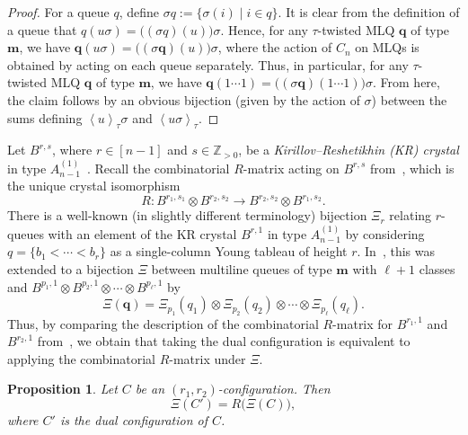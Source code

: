 \documentclass[reqno]{amsart}
\newcommand{\0}{\phantom{c}}
\newcommand{\swt}[1]{\left\langle #1 \right\rangle} %
\newcommand{\mm}{\mathbf{m}}
\newcommand{\qq}{\mathbf{q}}
\newcommand{\ZZ}{\mathbb{Z}}
\newcommand{\defn}[1]{{\color{darkred}\emph{#1}}} %
\theoremstyle{plain}
\newtheorem{prop}[thm]{Proposition}
\theoremstyle{definition}
\numberwithin{equation}{section}
\begin{document}
\begin{proof}
  For a queue $q$, define $\sigma q := \{ \sigma(i) \mid i \in q\}$.
  It is clear from the definition of a queue that $q(u \sigma) = \bigl( (\sigma q)(u) \bigr) \sigma$.
  Hence, for any $\tau$-twisted MLQ $\qq$ of type $\mm$, we have
  $\qq (u \sigma) = \bigl( (\sigma \qq)(u) \bigr) \sigma$,
  where the action of $C_n$ on MLQs is obtained by acting on each queue separately.
  Thus, in particular, for any $\tau$-twisted MLQ $\qq$ of type $\mm$, we have
  $\qq (1 \cdots 1) = \bigl( (\sigma \qq)(1 \cdots 1) \bigr) \sigma$.
  From here, the claim follows by an obvious bijection
  (given by the action of $\sigma$) between the sums defining
  $\swt{u}_{\tau} \sigma$ and $\swt{u \sigma}_{\tau}$.
\end{proof}

Let $B^{r,s}$, where $r \in [n-1]$ and $s \in \ZZ_{>0}$, be a \defn{Kirillov--Reshetikhin (KR) crystal} in type $A_{n-1}^{(1)}$~\cite{KKMMNN92}.
Recall the combinatorial $R$-matrix acting on $B^{r,s}$ from~\cite{NY97,Shimozono02}, which is the unique crystal isomorphism
\[
R \colon B^{r_1,s_1} \otimes B^{r_2,s_2} \to B^{r_2,s_2} \otimes B^{r_1,s_2}.
\]
There is a well-known (in slightly different terminology) bijection $\Xi_r$ relating $r$-queues with an element of the KR crystal $B^{r,1}$ in type $A_{n-1}^{(1)}$ by considering $q = \{b_1 < \cdots < b_r\}$  as a single-column Young tableau of height $r$.
In~\cite{KMO15}, this was extended to a bijection $\Xi$ between multiline queues of type $\mm$ with $\ell+1$ classes and $B^{p_1,1} \otimes B^{p_2,1} \otimes \dotsm \otimes B^{p_{\ell},1}$ by
\[
\Xi(\qq) = \Xi_{p_1}(q_1) \otimes \Xi_{p_2}(q_2) \otimes \dotsm \otimes \Xi_{p_{\ell}}(q_{\ell}).
\]
Thus, by comparing the description of the combinatorial $R$-matrix for $B^{r_1,1}$ and $B^{r_2,1}$ from~\cite{NY97}, we obtain that taking the dual configuration is equivalent to applying the combinatorial $R$-matrix under $\Xi$.

\begin{prop}
Let $C$ be an $(r_1, r_2)$-configuration. Then
\[
\Xi(C') = R\bigl( \Xi(C) \bigr),
\]
where $C'$ is the dual configuration of $C$.
\end{prop}
\end{document}
